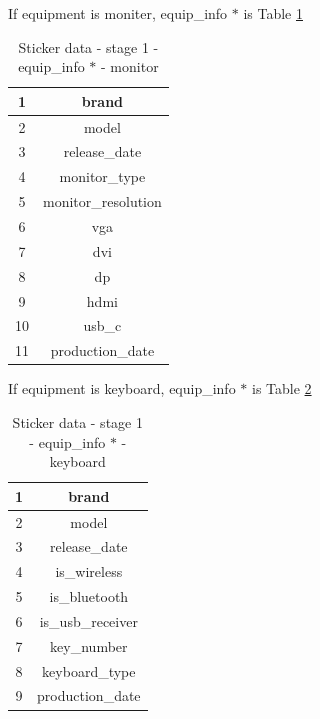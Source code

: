\documentclass[a4paper,11pt]{article}
\begin{document}
If equipment is moniter, equip\_info $*$ is Table \ref{table:sticker_data_stage_1_equip_info_monitor} 
\begin{table}[h!]
	\begin{center}
		\begin{tabular}{ | c | c | }
			\hline
			1 & brand \\ 
			\hline
			2 & model  \\  
			\hline
			3 & release\_date \\
			\hline
			4 & monitor\_type \\ 
			\hline
			5 &  monitor\_resolution \\  
			\hline
			6 & vga \\
			\hline
			7 &  dvi \\  
			\hline
			8 & dp \\
			\hline
			9 & hdmi \\
			\hline
			10 & usb\_c \\  
			\hline
			11 & production\_date \\
			\hline
		\end{tabular}
		\caption{Sticker data \-- stage 1 \-- equip\_info $*$ \-- monitor}
		\label{table:sticker_data_stage_1_equip_info_monitor}
	\end{center}
\end{table}

If equipment is keyboard, equip\_info $*$ is Table \ref{table:sticker_data_stage_1_equip_info_keyboard}
\begin{table}[h!]
	\begin{center}
		\begin{tabular}{ | c | c | }
			\hline
			1 & brand \\ 
			\hline
			2 & model  \\  
			\hline
			3 & release\_date \\
			\hline
			4 & is\_wireless \\ 
			\hline
			5 &  is\_bluetooth \\  
			\hline
			6 & is\_usb\_receiver \\
			\hline
			7 &  key\_number \\  
			\hline
			8 & keyboard\_type \\
			\hline
			9 & production\_date \\
			\hline
		\end{tabular}
		\caption{Sticker data \-- stage 1 \-- equip\_info $*$ \-- keyboard}
		\label{table:sticker_data_stage_1_equip_info_keyboard}
	\end{center}
\end{table}
\end{document}
